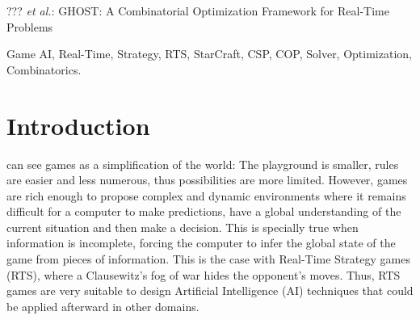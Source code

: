 \documentclass[journal]{IEEEtran}
\newcommand{\ghost}{\textsc{GHOST}\xspace}
\begin{document}
%
{??? \MakeLowercase{\textit{et al.}}: \ghost: A Combinatorial Optimization Framework for Real-Time Problems}

\maketitle

\begin{abstract}
  This paper presents \ghost, a combinatorial optimization framework
  that a Real-Time Strategy (RTS) AI developer can use to model and
  solve any problem encoded as a constraint satisfaction/optimization
  problem.  We show a way to model three different StarCraft (the RTS
  game used as a testbed) problems as a constraint
  satisfaction/optimization problem, and test our framework on them.
  Each problem belongs to a specific level of abstraction (the target
  selection as \emph{reactive control} problem, the wall-in as a
  \emph{tactics} problem and the build order planning as a
  \emph{strategy} problem). In our experiments, \ghost shows very good
  results computed within some tens of milliseconds. We also show
  \ghost outperforms by far state-of-the-art constraint solvers,
  matching them on the resources allocation problem, a very common combinatorial optimization problem.
\end{abstract}

\begin{IEEEkeywords}
Game AI, Real-Time, Strategy, RTS, StarCraft, CSP, COP, Solver,
Optimization, Combinatorics.
\end{IEEEkeywords}

%
\IEEEpeerreviewmaketitle

\section{Introduction}\label{sec:intro}

 can see games  as a simplification of the world:
The playground  is smaller, rules  are easier and less  numerous, thus
possibilities  are more  limited. However,  games are  rich enough  to
propose complex and dynamic environments where it remains difficult for a
computer  to make  predictions,  have a  global  understanding of  the
current situation  and then make  a decision. This is  specially true
when  information is  incomplete, forcing  the computer  to infer  the
global state of the game from  pieces of information. This is the case
with Real-Time Strategy  games (RTS), where a Clausewitz's  fog of war
hides  the opponent's  moves.  Thus,  RTS games  are very  suitable to
design  Artificial  Intelligence (AI) techniques  that  could  be  applied
afterward in other domains.
\end{document}
